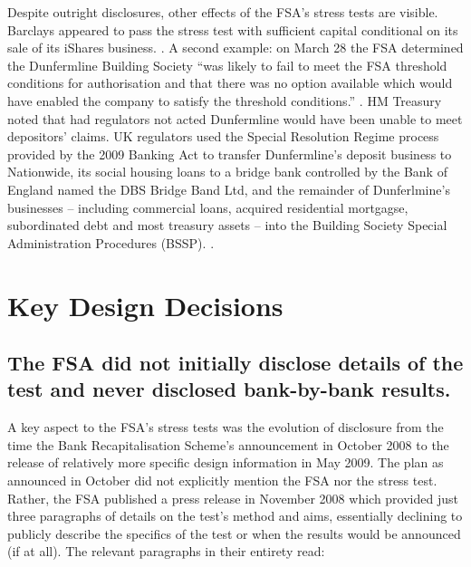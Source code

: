 \documentclass[12pt]{article}
\begin{document}
Despite outright disclosures, other effects of the FSA's stress tests are visible. Barclays appeared to pass the stress test with sufficient capital conditional on its sale of its iShares business. \citep{Barclays1}. A second example: on March 28 the FSA determined the Dunfermline Building Society ``was likely to fail to meet the FSA threshold conditions for authorisation and that there was no option available which would have enabled the company to satisfy the threshold conditions.'' \citep{DunferlminePress}. HM Treasury noted that had regulators not acted Dunfermline would have been unable to meet depositors' claims. UK regulators used the Special Resolution Regime process provided by the 2009 Banking Act to transfer Dunfermline's deposit business to Nationwide, its social housing loans to a bridge bank controlled by the Bank of England named the DBS Bridge Band Ltd, and the remainder of Dunferlmine's businesses -- including commercial loans, acquired residential mortgagse, subordinated debt and most treasury assets --  into the Building Society Special Administration Procedures (BSSP). \citep{DunferlminePress}. 

\section{Key Design Decisions}\label{keydesign}

\subsection{The FSA did not initially disclose details of the test and never disclosed bank-by-bank results.}

A key aspect to the FSA's stress tests was the evolution of disclosure from the time the Bank Recapitalisation Scheme's announcement in October 2008 to the release of relatively more specific design information in May 2009. The plan as announced in October did not explicitly mention the FSA nor the stress test. Rather, the FSA published a press release in November 2008 which provided just three paragraphs of details on the test's method and aims, essentially declining to publicly describe the specifics of the test or when the results would be announced (if at all). The relevant paragraphs in their entirety read:
\end{document}
